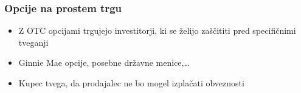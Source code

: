 \documentclass[14pt]{beamer}
\begin{document}
\begin{frame}    
    \frametitle{Opcije na prostem trgu}
    \begin{itemize}
        \item Z OTC opcijami trgujejo investitorji, ki se želijo zaščititi pred specifičnimi tveganji
        \item Ginnie Mae opcije, posebne državne menice,\ldots
        \item Kupec tvega, da prodajalec ne bo mogel izplačati obveznosti
    \end{itemize}
\end{frame}
\end{document}
